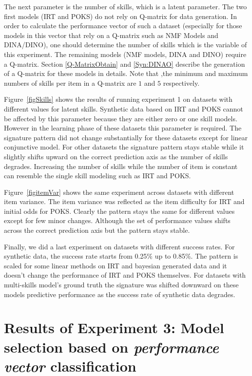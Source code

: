 The next parameter is the number of skills, which is a latent parameter. The two first models (IRT and POKS) do not rely on Q-matrix for data generation. In order to calculate the performance vector of such a dataset (especially for those models in this vector that rely on a Q-matrix such as NMF Models and DINA/DINO), one should determine the number of skills which is the variable of this experiment. The remaining models (NMF models, DINA and DINO) require a Q-matrix. Section \ref{Q-MatrixObtain} and \ref{Syn:DINAO} describe the generation of a Q-matrix for these models in details. Note that ,the minimum and maximum numbers of skills per item in a Q-matrix are $1$ and $5$ respectively.


Figure~\ref{figSkills} shows the results of running experiment 1 on datasets with different values for latent skills. Synthetic data based on IRT and POKS cannot be affected by this parameter because they are either zero or one skill models. However in the learning phase of these datasets this parameter is required. The signature pattern did not change substantially for these datasets except for linear conjunctive model. For other datasets the signature pattern stays stable while it slightly shifts upward on the correct prediction axis as the number of skills degrades. Increasing the number of skills while the number of item is constant can resemble the single skill modeling such as IRT and POKS. 

Figure~\ref{figitemVar} shows the same experiment across datasets with different item variance. The item variance was reflected as the item difficulty for IRT and initial odds for POKS. Clearly the pattern stays the same for different values except for few minor changes. Although the set of performance values shifts across the correct prediction axis but the pattern stays stable.

Finally, we did a last experiment on datasets with different success rates. For synthetic data, the success rate starts from 0.25\% up to 0.85\%. The pattern is scaled for some linear methods on IRT and bayesian generated data and it doesn't change the performance of IRT and POKS themselves. For datasets with multi-skills model's ground truth the signature was shifted downward on these models predictive performance as the success rate of synthetic data degrades.

\section{Results of Experiment 3: Model selection based on \textit{performance vector} classification}
 
